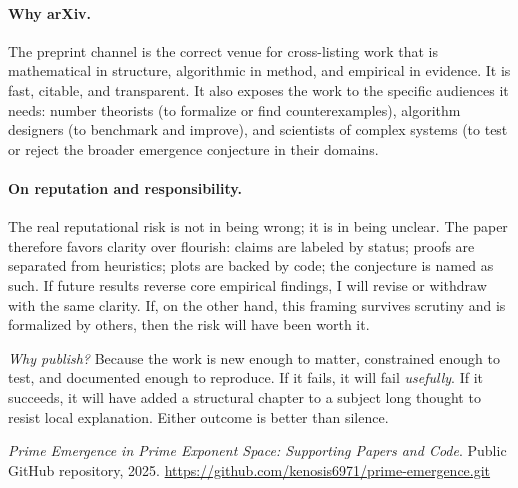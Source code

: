 \documentclass[11pt]{article}
\theoremstyle{plain}
\theoremstyle{definition}
\begin{document}
\paragraph{Why arXiv.}
The preprint channel is the correct venue for cross-listing work that is mathematical in structure, algorithmic in method, and empirical in evidence. It is fast, citable, and transparent. It also exposes the work to the specific audiences it needs: number theorists (to formalize or find counterexamples), algorithm designers (to benchmark and improve), and scientists of complex systems (to test or reject the broader emergence conjecture in their domains.

\paragraph{On reputation and responsibility.}
The real reputational risk is not in being wrong; it is in being unclear. The paper therefore favors clarity over flourish: claims are labeled by status; proofs are separated from heuristics; plots are backed by code; the conjecture is named as such. If future results reverse core empirical findings, I will revise or withdraw with the same clarity. If, on the other hand, this framing survives scrutiny and is formalized by others, then the risk will have been worth it.

\medskip
\noindent
\emph{Why publish?} Because the work is new enough to matter, constrained enough to test, and documented enough to reproduce. If it fails, it will fail \emph{usefully}. If it succeeds, it will have added a structural chapter to a subject long thought to resist local explanation. Either outcome is better than silence.

\begin{thebibliography}{9}

\newblock \emph{Prime Emergence in Prime Exponent Space: Supporting Papers and Code}.
\newblock Public GitHub repository, 2025.
\newblock \url{https://github.com/kenosis6971/prime-emergence.git}

\end{thebibliography}
\end{document}
